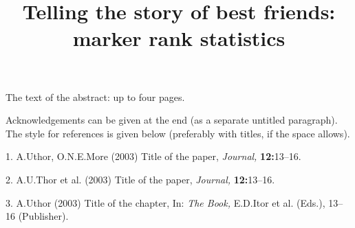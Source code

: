 \documentclass[12pt]{article}
\begin{document}

\title{Telling the story of best friends: marker rank statistics}

\vspace{6mm}

The text of the abstract: up to four pages.

Acknowledgements can be given at the end (as a separate untitled paragraph). The style for references is given below (preferably with titles, if the space allows).

\vspace{2mm}

1. A.Uthor, O.N.E.More (2003) Title of the paper, \textit{Journal, }\textbf{12:}13–16.

2. A.U.Thor et al. (2003) Title of the paper, \textit{Journal, }\textbf{12:}13–16.

3. A.Uthor (2003) Title of the chapter, In: \textit{The Book,} E.D.Itor et al. (Eds.), 13–16 (Publisher).
\end{document}

